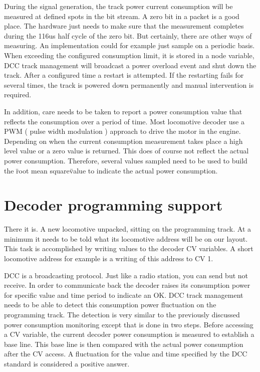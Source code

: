 During the signal generation, the track power current consumption will be measured at defined spots in the bit stream. A zero bit in a packet is a good place. The hardware just needs to make sure that the measurement completes during the 116us half cycle of the zero bit. But certainly, there are other ways of measuring. An implementation could for example just sample on a periodic basis. When exceeding the configured consumption limit, it is stored in a node variable, DCC track management will broadcast a power overload event and shut down the track. After a configured time a restart is attempted. If the restarting fails for several times, the track is powered down permanently and manual intervention is required.

In addition, care needs to be taken to report a power consumption value that reflects the consumption over a period of time. Most locomotive decoder use a PWM ( pulse width modulation ) approach to drive the motor in the engine. Depending on when the current consumption measurement takes place a high level value or a zero value is returned. This does of course not reflect the actual power consumption. Therefore, several values sampled need to be used to build the \"root mean square\" value to indicate the actual power consumption.

\section{Decoder programming support}

There it is. A new locomotive unpacked, sitting on the programming track. At a minimum it needs to be told what its locomotive address will be on our layout. This task is accomplished by writing values to the decoder CV variables. A short locomotive address for example is a writing of this address to CV 1.

DCC is a broadcasting protocol. Just like a radio station, you can send but not receive. In order to communicate back the decoder raises its consumption power for specific value and time period to indicate an OK. DCC track management needs to be able to detect this consumption power fluctuation on the programming track. The detection is very similar to the previously discussed power consumption monitoring except that is done in two steps. Before accessing a CV variable, the current decoder power consumption is measured to establish a base line. This base line is then compared with the actual power consumption after the CV access. A fluctuation for the value and time specified by the DCC standard is considered a positive answer.

